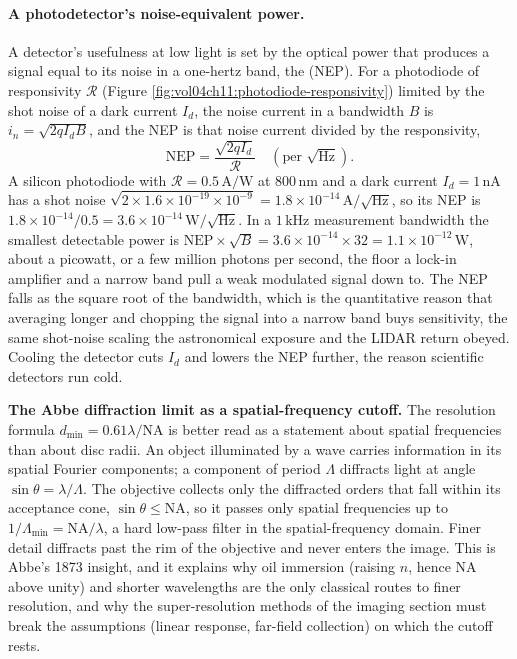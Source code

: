 \paragraph{A photodetector's noise-equivalent power.} A detector's usefulness at
low light is set by the optical power that produces a signal equal to its noise in
a one-hertz band, the  (NEP). For a photodiode of
responsivity $\mathcal{R}$ (Figure \ref{fig:vol04ch11:photodiode-responsivity})
limited by the shot noise of a dark current $I_d$, the noise current in a bandwidth
$B$ is $i_n = \sqrt{2 q I_d B}$, and the NEP is that noise current divided by the
responsivity,
\[
\mathrm{NEP} = \frac{\sqrt{2 q I_d}}{\mathcal{R}}
\quad(\text{per }\sqrt{\si{\hertz}}).
\]
A silicon photodiode with $\mathcal{R} = 0.5\,\si{\ampere\per\watt}$ at
$800\,\si{\nano\meter}$ and a dark current $I_d = 1\,\si{\nano\ampere}$ has a shot
noise $\sqrt{2\times 1.6\times 10^{-19}\times 10^{-9}} = 1.8\times
10^{-14}\,\si{\ampere}/\sqrt{\si{\hertz}}$, so its NEP is
$1.8\times 10^{-14}/0.5 = 3.6\times 10^{-14}\,\si{\watt}/\sqrt{\si{\hertz}}$. In a
$1\,\si{\kilo\hertz}$ measurement bandwidth the smallest detectable power is
$\mathrm{NEP}\times\sqrt{B} = 3.6\times 10^{-14}\times 32 = 1.1\times
10^{-12}\,\si{\watt}$, about a picowatt, or a few million photons per second, the
floor a lock-in amplifier and a narrow band pull a weak modulated signal down to.
The NEP falls as the square root of the bandwidth, which is the quantitative reason
that averaging longer and chopping the signal into a narrow band buys sensitivity,
the same shot-noise scaling the astronomical exposure and the LIDAR return obeyed.
Cooling the detector cuts $I_d$ and lowers the NEP further, the reason scientific
detectors run cold.



\begin{mastery}
\textbf{The Abbe diffraction limit as a spatial-frequency cutoff.} The
resolution formula $d_{\min} = 0.61\lambda/\text{NA}$ is better read as
a statement about spatial frequencies than about disc radii. An object
illuminated by a wave carries information in its spatial Fourier
components; a component of period $\Lambda$ diffracts light at angle
$\sin\theta = \lambda/\Lambda$. The objective collects only the
diffracted orders that fall within its acceptance cone, $\sin\theta \le
\text{NA}$, so it passes only spatial frequencies up to
$1/\Lambda_{\min} = \text{NA}/\lambda$, a hard low-pass filter in the
spatial-frequency domain. Finer detail diffracts past the rim of the
objective and never enters the image. This is Abbe's 1873 insight, and
it explains why oil immersion (raising $n$, hence NA above unity) and
shorter wavelengths are the only classical routes to finer resolution,
and why the super-resolution methods of the imaging section must break
the assumptions (linear response, far-field collection) on which the
cutoff rests.
\end{mastery}

